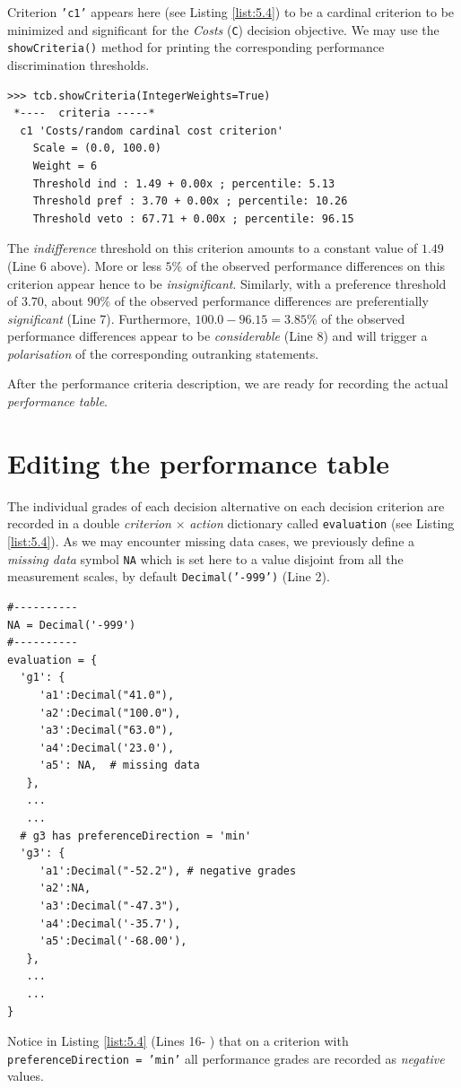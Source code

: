 Criterion \texttt{'c1'} appears here (see Listing \ref{list:5.4}) to be a cardinal criterion to be minimized and significant for the \emph{Costs} (\texttt{C}) decision objective. We may use the {\tt showCriteria()} method for printing the corresponding performance discrimination thresholds.
\begin{lstlisting}
>>> tcb.showCriteria(IntegerWeights=True)
 *----  criteria -----*
  c1 'Costs/random cardinal cost criterion'
    Scale = (0.0, 100.0)
    Weight = 6 
    Threshold ind : 1.49 + 0.00x ; percentile: 5.13
    Threshold pref : 3.70 + 0.00x ; percentile: 10.26
    Threshold veto : 67.71 + 0.00x ; percentile: 96.15
\end{lstlisting}
The \emph{indifference} threshold on this criterion amounts to a constant value of $1.49$ (Line 6 above). More or less $5\%$ of the observed performance differences on this criterion appear hence to be \emph{insignificant}. Similarly, with a preference threshold of $3.70$, about $90\%$ of the observed performance differences are preferentially \emph{significant} (Line 7). Furthermore, $100.0 - 96.15 = 3.85\%$ of the observed performance differences appear to be \emph{considerable} (Line 8) and will trigger a \emph{polarisation} of the corresponding outranking statements.

After the performance criteria description, we are ready for recording the actual \emph{performance table}.

\section{Editing the performance table}
\label{sec:5.5}

The individual grades of each decision alternative on each decision criterion are recorded in a double \emph{criterion} $\times$ \emph{action} dictionary called \texttt{evaluation} (see Listing \ref{list:5.4}). As we may encounter missing data cases, we previously define a \emph{missing data} symbol \texttt{NA} which is set here to a value disjoint from all the measurement scales, by default \texttt{Decimal('-999')} (Line 2).
\begin{lstlisting}[caption={Editing performance grades},label=list:5.5]
#----------
NA = Decimal('-999')
#----------
evaluation = {
  'g1': {
     'a1':Decimal("41.0"),
     'a2':Decimal("100.0"),
     'a3':Decimal("63.0"),
     'a4':Decimal('23.0'),
     'a5': NA,  # missing data
   },
   ...
   ...
  # g3 has preferenceDirection = 'min'
  'g3': {
     'a1':Decimal("-52.2"), # negative grades
     'a2':NA,
     'a3':Decimal("-47.3"),
     'a4':Decimal('-35.7'),
     'a5':Decimal('-68.00'),
   },
   ...
   ...
}
\end{lstlisting}
Notice in Listing \ref{list:5.4} (Lines 16- ) that on a criterion with \texttt{preferenceDirection = 'min'} all performance grades are recorded as \emph{negative} values.

